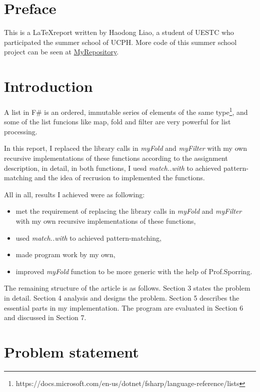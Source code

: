 \section{Preface}

This is a \LaTeX report written by Haodong Liao, a student of UESTC who participated the summer school of UCPH. More code of this summer school project can be seen at \href{https://github.com/Medill-East/ComputerScience/tree/master/Professional%20Core%20Courses/Functional%20Programming/SummerSchool}{MyRepository}.

\section{Introduction}

A list in F\# is an ordered, immutable series of elements of the same type\footnote[1]{https://docs.microsoft.com/en-us/dotnet/fsharp/language-reference/lists}, and some of the list funcions like map, fold and filter are very powerful for list processing. 

In this report, I replaced the library calls in \emph{myFold} and \emph{myFilter} with my own recursive implementations of these functions according to the assignment description, in detail, in both functions, I uesd \emph{match..with} to achieved pattern-matching and the idea of recrusion to implemented the functions.

All in all, results I achieved were as following:

\begin{itemize}
\item met the requirement of replacing the library calls in \emph{myFold} and \emph{myFilter} with my own recursive implementations of these functions,
\item used \emph{match..with} to achieved pattern-matching,
\item made program work by my own,
\item improved \emph{myFold} function to be more generic with the help of Prof.Sporring.
\end{itemize}

The remaining structure of the article is as follows. Section 3 states the problem in detail. Section 4 analysis and designs the problem. Section 5 describes the essential parts in my implementation. The program are evaluated in Section 6 and discussed in Section 7.

\section{Problem statement}

